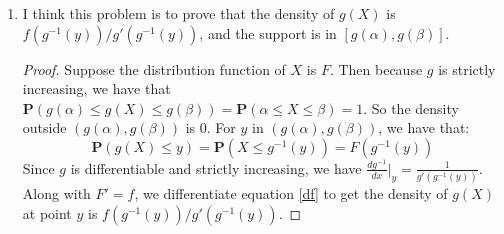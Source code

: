 \documentclass[11pt]{article}
\newcommand{\prob}[1]{\textbf{P} \left( #1 \right)}
\begin{document}
\begin{enumerate}[1.2.5]
    \item
    I think this problem is to prove that the density of $g(X)$ is $f(g^{-1}(y))/g'(g^{-1}(y))$, and the support is in $[g(\alpha), g(\beta)]$.
    \begin{proof}
        Suppose the distribution function of $X$ is $F$. Then because $g$ is strictly increasing, we have that $\prob{g(\alpha) \le g(X) \le g(\beta)} = \prob{\alpha \le X \le \beta} = 1$. So the density outside $(g(\alpha), g(\beta))$ is $0$. 
        For $y$ in $(g(\alpha), g(\beta))$, we have that:
        \begin{equation} \label{df}
            \prob{g(X) \le y} = \prob{X \le g^{-1}(y)} = F(g^{-1}(y))            
        \end{equation}
        Since $g$ is differentiable and strictly increasing, we have $\frac{dg^{-1}}{dx}|_y = \frac{1}{g'(g^{-1}(y))}$. Along with $F' = f$, we differentiate equation \ref{df} to get the density of $g(X)$ at point $y$ is $f(g^{-1}(y))/g'(g^{-1}(y))$.
    \end{proof}
\end{enumerate}
\end{document}
